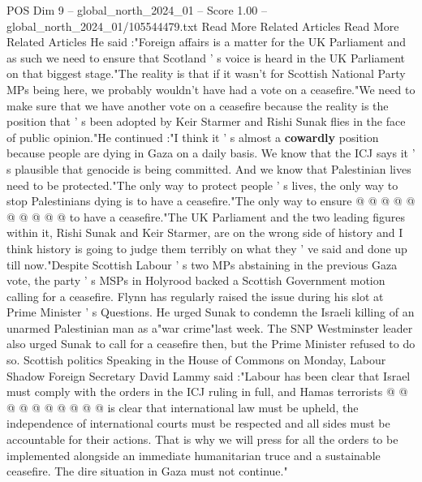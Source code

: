 \begin{textsample}{POS Dim 9 – global\_north\_2024\_01 – Score 1.00 – global\_north\_2024\_01/105544479.txt}  \label{ex:f9_pos_267}
Read More Related Articles Read More Related Articles He said :"Foreign affairs is a matter for the UK Parliament and as such we need to ensure that Scotland ' s voice is heard in the UK Parliament on that biggest stage."The reality is that if it wasn't for Scottish National Party MPs being here, we probably wouldn't have had a vote on a ceasefire."We need to make sure that we have another vote on a ceasefire because the reality is the position that ' s been adopted by Keir Starmer and Rishi Sunak flies in the face of public opinion."He continued :"I think it ' s almost a \textbf{cowardly} position because people are dying in Gaza on a daily basis.
We know that the ICJ says it ' s plausible that genocide is being committed.
And we know that Palestinian lives need to be protected."The only way to protect people ' s lives, the only way to stop Palestinians dying is to have a ceasefire."The only way to ensure @ @ @ @ @ @ @ @ @ @ to have a ceasefire."The UK Parliament and the two leading figures within it, Rishi Sunak and Keir Starmer, are on the wrong side of history and I think history is going to judge them terribly on what they ' ve said and done up till now."Despite Scottish Labour ' s two MPs abstaining in the previous Gaza vote, the party ' s MSPs in Holyrood backed a Scottish Government motion calling for a ceasefire.
Flynn has regularly raised the issue during his slot at Prime Minister ' s Questions.
He urged Sunak to condemn the Israeli killing of an unarmed Palestinian man as a"war crime"last week.
The SNP Westminster leader also urged Sunak to call for a ceasefire then, but the Prime Minister refused to do so.
Scottish politics Speaking in the House of Commons on Monday, Labour Shadow Foreign Secretary David Lammy said :"Labour has been clear that Israel must comply with the orders in the ICJ ruling in full, and Hamas terrorists @ @ @ @ @ @ @ @ @ @ is clear that international law must be upheld, the independence of international courts must be respected and all sides must be accountable for their actions.
That is why we will press for all the orders to be implemented alongside an immediate humanitarian truce and a sustainable ceasefire.
The dire situation in Gaza must not continue."

\end{textsample}
